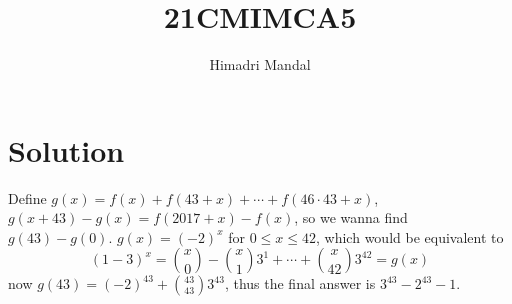 \documentclass[11pt]{scrartcl}
\title{21CMIMCA5}
\author{Himadri Mandal}
\begin{document}
\maketitle

\section{Solution}
\begin{soln}
Define $g(x) = f(x) + f(43 + x) + \cdots + f(46 \cdot 43 + x)$, $g(x+43) - g(x) 
= f(2017 + x) - f(x)$, so we wanna find $g(43) - g(0)$. $g(x) = (-2)^x$ for $0 \leq x \leq 42$,
which would be equivalent to 
\[ (1-3)^x = \binom{x}{0} - \binom{x}{1}3^1 + \cdots + \binom{x}{42}3^{42} = g(x)\]
now $g(43) = (-2)^{43} + \binom{43}{43}3^{43}$, thus the final answer is $3^{43}-2^{43}-1$.
\end{soln}
\end{document}

